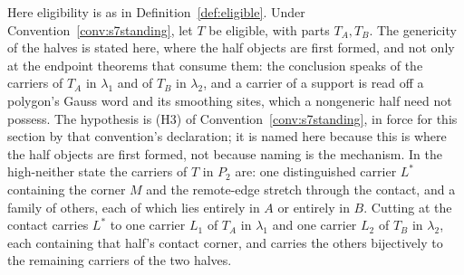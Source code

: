 \begin{lemma}\label{lem:contactsplit}
Here eligibility is as in Definition~\ref{def:eligible}.
Under Convention~\ref{conv:s7standing}, let $T$ be eligible, with parts
$T_A,T_B$. The genericity of the halves is stated here,
where the half objects are first formed, and not only at the endpoint theorems
that consume them: the conclusion speaks of the carriers of $T_A$ in
$\lambda_1$ and of $T_B$ in $\lambda_2$, and a carrier of a support is read off
a polygon's Gauss word and its smoothing sites, which a nongeneric half need
not possess. The hypothesis is (H3) of Convention~\ref{conv:s7standing}, in force for this
section by that convention's declaration; it is named here because this is
where the half objects are first formed, not because naming is the mechanism. In the high-neither state the
carriers of $T$ in $P_2$ are: one distinguished carrier $L^{*}$ containing the
corner $M$ and the remote-edge stretch through the contact, and a family of
others, each of which lies entirely in $A$ or entirely in $B$. Cutting at the
contact carries $L^{*}$ to one carrier $L_1$ of $T_A$ in $\lambda_1$ and one
carrier $L_2$ of $T_B$ in $\lambda_2$, each containing that half's contact
corner, and carries the others bijectively to the remaining carriers of the two
halves.


\end{lemma}
